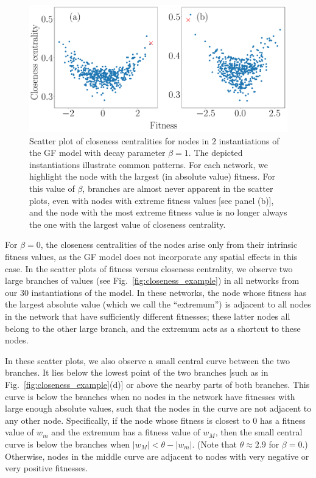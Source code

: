 \documentclass[%
 reprint,
 amsmath,amssymb,
 aps,
]{revtex4-1}
\begin{document}
\begin{figure}
    \centering
    \includegraphics[width=0.8\linewidth]{geographic_beta_10_examples_largerfont.pdf}
    \caption{Scatter plot of closeness centralities for nodes in $2$ instantiations of the GF model with decay parameter $\beta = 1$. The depicted instantiations illustrate common patterns. For each network, we highlight the node with the largest (in absolute value) fitness. For this value of $\beta$, branches are almost never apparent in the scatter plots, even with nodes with extreme fitness values [see panel (b)], and the node with the most extreme fitness value is no longer always the one with the largest value of closeness centrality.
    }
    \label{fig:closeness_example_3}
\end{figure}


For $\beta = 0$, the closeness centralities of the nodes arise only from their intrinsic fitness values, as the GF model does not incorporate any spatial effects in this case. In the scatter plots of fitness versus closeness centrality, we observe two large branches of values (see Fig.~\ref{fig:closeness_example}) in all networks from our $30$ instantiations of the model. In these networks, the node whose fitness has the largest absolute value (which we call the ``extremum'') is adjacent to all nodes in the network that have sufficiently different fitnesses; these latter nodes all belong to the other large branch, and the extremum acts as a shortcut to these nodes.

In these scatter plots, we also observe a small central curve between the two branches. It lies below the lowest point of the two branches [such as in Fig.~\ref{fig:closeness_example}(d)] or above the nearby parts of both branches. This curve is below the branches when no nodes in the network have fitnesses with large enough absolute values, such that the nodes in the curve are not adjacent to any other node. Specifically, if the node whose fitness is closest to $0$ has a fitness value of $w_m$ and the extremum has a fitness value of $w_M$, then the small central curve is below the branches when $|w_M| < \theta - |w_m|$. (Note that $\theta \approx 2.9$ for $\beta = 0$.) Otherwise, nodes in the middle curve are adjacent to nodes with very negative or very positive fitnesses. 
\end{document}
